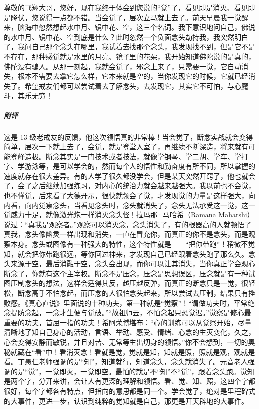 \begin{case}
    尊敬的飞翔大哥，您好，现在我终于体会到您说的“觉”了，看见即是消灭、看见即是降伏，您说得一点都不错。当会觉了，层次立马就上去了。前天早晨我一觉醒来，脑海中忽然想起水中月、镜中花、空，这三个名词。我下意识地问自己，佛说的水中月、镜中花、空到底是什么？此时忽然一个负面念头劫持我，我突然明白了，我问自己那个念头在哪里，我试着去找那个念头，我发现找不到，但是它不是不存在，那种感觉就是水里的月亮、镜子里的花朵，我开始知道佛陀说的是真的，佛陀没有骗人。从那一刻起，我就会觉了，邪念上来了，只需要一觉，它自动消失，根本不需要去拿它怎么样，它本来就是空的，当你发现它的时候，它就已经消失了。希望戒友们都可以尝试着去了解念头，去发现它，其实它不可怕，与心魔斗，其乐无穷！
    \subparagraph{附评} 这是 13 级老戒友的反馈，他这次领悟真的非常棒！当会觉了，断念实战就会变得简单，层次一下就上去了，会觉，就是登堂入室了，再继续不断深造，将来就有可能登峰造极。断念其实是一门技术或者技法，就像学钢琴、学二胡、学车、学打字、学游泳等，是可以学会的，然而每个人的悟性和勤奋度有所不同，所以掌握的速度就存在很大差异。有的人学了很久都没学会，但是某天突然开窍了，他也就会了，会了之后继续加强练习，对内心的统治力就会越来越强大。我以前也不会觉，也不懂觉，后来看了大德开示，很快就领会了觉，才发现觉的力量是这样强大，向内看，向内觉察念头，当看见念头时，念头就消失了，念头无法承受这一觉，这一觉威力十足，就像激光炮一样消灭念头怪！拉玛那·马哈希（Ramana Maharshi）说过：“真我是观察者。”观察可以消灭念，念头消失了，有的根器高的人就顿悟了真我，念头像幽灵一样出现和消失，一直在冒充你，而真正的你不是念头，而是观察本身。念头或图像有一种强大的特性，这个特性就是——“把你带跑”！稍微不觉知，就会把你带跑很远，等你回过神来，才发现自己已经跟着念头跑了那么久。念头来源于空，最后消融于空，念头会出现，而你可以让其消失，当你真正学会观心断念了，你就有这个主宰权。断念不是压念，压念是思想误区，压念就是有一种试图压制念头的想法，这样会适得其反，越压越反弹，而真正的断念只是一觉，很轻松，断念高手不怕念起，而压念的人很怕念头起来，所以尝试去压制，结果只有挫败感。《真心直说》里面说的十种功夫，第一种就是“觉察”！“谓做功夫时，平常绝念提防念起，一念才生便与觉破。”“故祖师云，不怕念起只恐觉迟。”觉察是修心最重要的功夫，首屈一指的功夫！希阿荣博堪布：“心的训练可以从觉察开始，尽量清晰地了知自己身心的活动，言语、举动、感受、情绪、心念的生灭变化，久之，心会变得安静而敏锐，并且对苦、无常等生出切身的领悟。”你不会想到，一切的奥秘就藏在“看”中！看消灭念！看就是觉，觉就是知，知就是照，照就是观，观就是看。丁愚仁老师强调的是“知”，知道就行，知道念头，念头就消失了。元音老人强调的是“觉”，一觉即灭，一觉即空。最怕的就是不“知”不“觉”，跟着念头跑。觉知是两个字，分开来讲，会让人有更深的理解和领悟。看、觉、知、照，这四个字都很好，每个字都各有特点，但指向的意思都是同一个。学会觉了，绝对是里程碑式的大事件，更进一步，认识到纯粹的觉知就是自己，那更是开天辟地的大事件。
\end{case}

